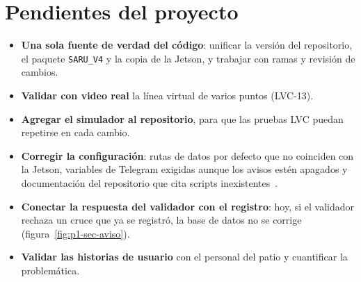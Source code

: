 \section{Pendientes del proyecto}

\begin{itemize}
  \item \textbf{Una sola fuente de verdad del código}: unificar la versión
        del repositorio, el paquete \texttt{SARU\_V4} y la copia de la
        Jetson, y trabajar con ramas y revisión de cambios.
  \item \textbf{Validar con video real} la línea virtual de varios puntos
        (LVC-13).
  \item \textbf{Agregar el simulador al repositorio}, para que las pruebas
        LVC puedan repetirse en cada cambio.
  \item \textbf{Corregir la configuración}: rutas de datos por defecto que
        no coinciden con la Jetson, variables de Telegram exigidas aunque
        los avisos estén apagados y documentación del repositorio que cita
        scripts inexistentes~\cite{rep-tecnico}.
  \item \textbf{Conectar la respuesta del validador con el registro}: hoy,
        si el validador rechaza un cruce que ya se registró, la base de
        datos no se corrige (figura~\ref{fig:p1-sec-aviso}).
  \item \textbf{Validar las historias de usuario} con el personal del patio
        y cuantificar la problemática.
\end{itemize}
